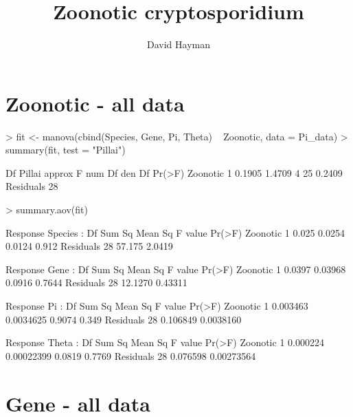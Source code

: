 \documentclass{article}
\begin{document}


\title{Zoonotic cryptosporidium}
\author{David Hayman}




\maketitle

\section{Zoonotic - all data}


\begin{Schunk}
\begin{Sinput}
> fit <- manova(cbind(Species, Gene, Pi, Theta) ~ Zoonotic, data = Pi_data)
> summary(fit, test = "Pillai")
\end{Sinput}
\begin{Soutput}
          Df Pillai approx F num Df den Df Pr(>F)
Zoonotic   1 0.1905   1.4709      4     25 0.2409
Residuals 28                                     
\end{Soutput}
\begin{Sinput}
> summary.aov(fit)
\end{Sinput}
\begin{Soutput}
 Response Species :
            Df Sum Sq Mean Sq F value Pr(>F)
Zoonotic     1  0.025  0.0254  0.0124  0.912
Residuals   28 57.175  2.0419               

 Response Gene :
            Df  Sum Sq Mean Sq F value Pr(>F)
Zoonotic     1  0.0397 0.03968  0.0916 0.7644
Residuals   28 12.1270 0.43311               

 Response Pi :
            Df   Sum Sq   Mean Sq F value Pr(>F)
Zoonotic     1 0.003463 0.0034625  0.9074  0.349
Residuals   28 0.106849 0.0038160               

 Response Theta :
            Df   Sum Sq    Mean Sq F value Pr(>F)
Zoonotic     1 0.000224 0.00022399  0.0819 0.7769
Residuals   28 0.076598 0.00273564               
\end{Soutput}
\end{Schunk}

\section{Gene - all data}
\end{document}
